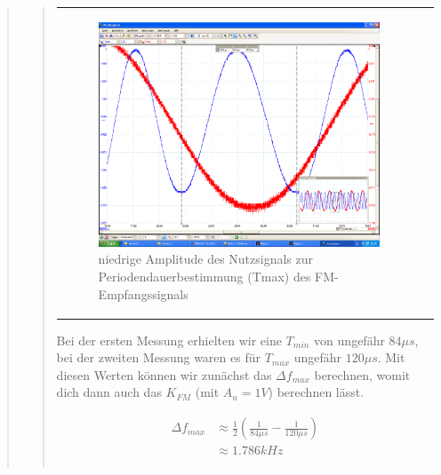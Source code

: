 \begin{quote}
\begin{quote}
\begin{center}
\begin{tabular}{ll}
\begin{minipage}{0.6\textwidth}
                     \begin{figure}[H]
                        \label{fig:}
                        \includegraphics[scale=0.5, trim = 2cm 6.5cm 1.5cm
                        8.5cm, clip]{./Bilder/aufgabe_4_12_sinus_low-ampl}
                        \caption{niedrige Amplitude des Nutzsignals zur
                        Periodendauerbestimmung (Tmax) des FM-Empfangssignals}
                    \end{figure}
               \vspace{-1.5em}

                \end{minipage}

            \end{tabular}
            \end{center}
        
        Bei der ersten Messung erhielten wir eine $T_{min}$ von ungefähr 
        $84\mu s$, bei der zweiten Messung waren es für $T_{max}$ ungefähr 
        $120\mu s$. Mit diesen Werten können wir zunächst das $\Delta f_{max}$
        berechnen, womit dich dann auch das $K_{FM}$ (mit $A_u = 1V$) berechnen
        lässt.
        
      \begin{equation*}
       \begin{split}
		\Delta f_{max} &\approx \frac{1}{2} (\frac{1}{84\mu s} - \frac{1}{120\mu s})\\
					   &\approx 1.786 kHz \\
		\\			
			

\end{split}
\end{equation*}
\end{quote}
\end{quote}

